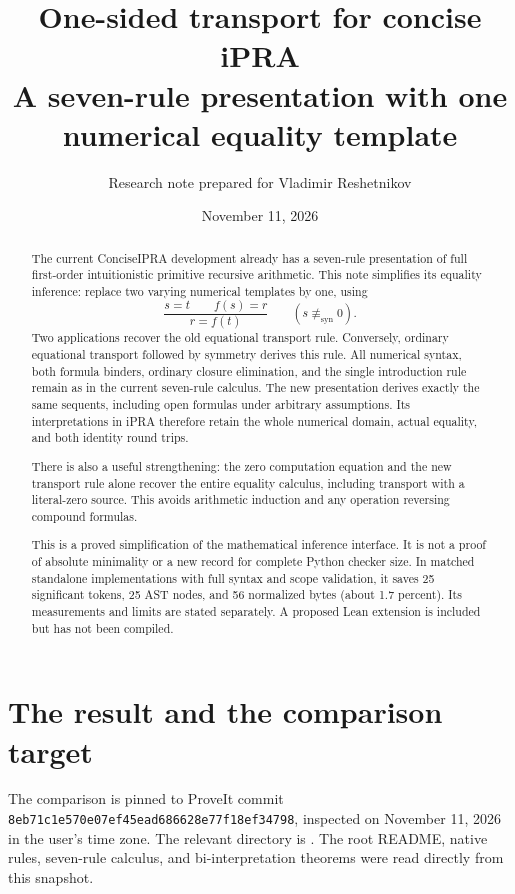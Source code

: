 \documentclass[11pt]{article}
\title{One-sided transport for concise iPRA\\[4pt]\large A seven-rule presentation with one numerical equality template}
\author{Research note prepared for Vladimir Reshetnikov}
\date{November 11, 2026}
\theoremstyle{definition}\newtheorem{definition}[theorem]{Definition}
\theoremstyle{remark}\newtheorem{remark}[theorem]{Remark}
\newcommand{\nolit}{\not\equiv_{\mathrm{syn}}}
\begin{document}
\maketitle
\begin{abstract}
The current ConciseIPRA development already has a seven-rule presentation
of full first-order intuitionistic primitive recursive arithmetic. This
note simplifies its equality inference: replace two varying numerical
templates by one, using
\[
   \frac{s=t\qquad f(s)=r}{r=f(t)}\qquad(s\nolit0).
\]
Two applications recover the old equational transport rule. Conversely,
ordinary equational transport followed by symmetry derives this rule.
All numerical syntax, both formula binders, ordinary closure elimination,
and the single introduction rule remain as in the current seven-rule
calculus. The new presentation derives exactly the same sequents, including
open formulas under arbitrary assumptions. Its interpretations in iPRA
therefore retain the whole numerical domain, actual equality, and both
identity round trips.

There is also a useful strengthening: the zero computation equation and
the new transport rule alone recover the entire equality calculus,
including transport with a literal-zero source. This avoids arithmetic
induction and any operation reversing compound formulas.

This is a proved simplification of the mathematical inference interface.
It is not a proof of absolute minimality or a new record for complete
Python checker size. In matched standalone implementations with full
syntax and scope validation, it saves 25 significant tokens, 25 AST nodes,
and 56 normalized bytes (about 1.7 percent). Its measurements and limits
are stated separately. A proposed Lean extension is included but has not been compiled.
\end{abstract}
\newpage
\tableofcontents
\newpage

\section{The result and the comparison target}

The comparison is pinned to ProveIt commit
\texttt{8eb71c1e570e07ef45ead686628e77f18ef34798}, inspected on
November 11, 2026 in the user's time zone. The relevant directory is
.
The root README, native rules, seven-rule calculus, and bi-interpretation
theorems were read directly from this snapshot\cite{readme,native,minimal,bridge}.
\end{document}
